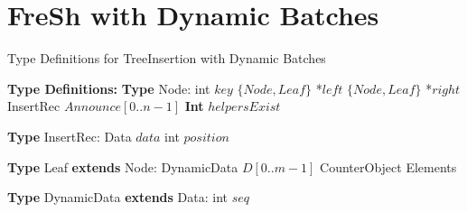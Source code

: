 \documentclass[a4paper,11pt,twoside,openany]{book}
\newcommand{\selam}[0]{\selectlanguage{american}}
\begin{document}
\selam

\pagestyle{plain}
\setcounter{page}{1}
\setcounter{tocdepth}{3}

\tableofcontents

\listoftables

\listoffigures






 \pagestyle{headings}





    
\section{FreSh with Dynamic Batches}


\begin{algorithm}[t]
    \footnotesize
    \caption{Type Definitions for TreeInsertion with Dynamic Batches}
    \label{alg:tree-types-dynamic}
    \begin{algorithmic}[1]
        \Statex \textbf{Type Definitions:}
        \State \textbf{Type} Node:
        \State \quad int $\mathit{key}$
        \State \quad $\{Node,Leaf\}$ *$\mathit{left}$
        \State \quad $\{Node,Leaf\}$ *$\mathit{right}$
        \State \quad InsertRec $\mathit{Announce}[0..n-1]$
        \State \quad \textbf{Int} $\mathit{helpersExist}$

        \Statex
        \State \textbf{Type} InsertRec:
        \State \quad Data $\mathit{data}$
        \State \quad int $\mathit{position}$

        \Statex
        \State \textbf{Type} Leaf \textbf{extends} Node:
        \State \quad DynamicData $D[0..m-1]$
        \State \quad CounterObject Elements

        \Statex
        \State \textbf{Type} DynamicData \textbf{extends} Data:
        \State \quad int $\mathit{seq}$

    \end{algorithmic}
\end{algorithm}
\end{document}
